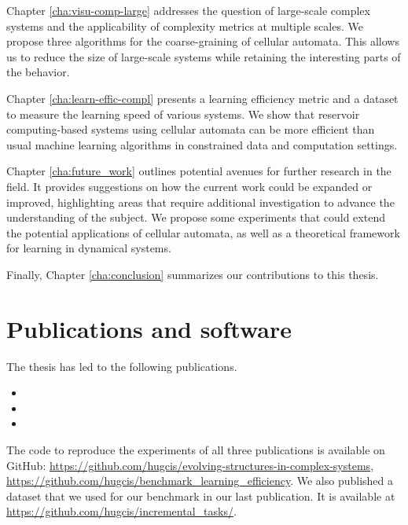 Chapter \ref{cha:visu-comp-large} addresses the question of large-scale complex
systems and the applicability of complexity metrics at multiple scales. We
propose three algorithms for the coarse-graining of cellular automata. This allows
us to reduce the size of large-scale systems while retaining the interesting parts
of the behavior.

Chapter \ref{cha:learn-effic-compl} presents a learning efficiency metric and a
dataset to measure the learning speed of various systems. We show that
reservoir computing-based systems using cellular automata can be more efficient
than usual machine learning algorithms in constrained data and computation
settings.

Chapter \ref{cha:future_work} outlines potential avenues for further research in 
the field. It provides suggestions on how the current work could be expanded or 
improved, highlighting areas that require additional investigation to advance the 
understanding of the subject. We propose some experiments that could extend the 
potential applications of cellular automata, as well as a theoretical framework 
for learning in dynamical systems.

Finally, Chapter \ref{cha:conclusion} summarizes our contributions to this thesis. 

\section{Publications and software}

The thesis has led to the following publications.

\begin{itemize}
  \item {}
  \item {}
  \item {}
\end{itemize}

The code to reproduce the experiments of all three publications is available on
GitHub: \url{https://github.com/hugcis/evolving-structures-in-complex-systems},
\url{https://github.com/hugcis/benchmark_learning_efficiency}. We also published a
dataset that we used for our benchmark in our last
publication. It is available at
\url{https://github.com/hugcis/incremental_tasks/}.
